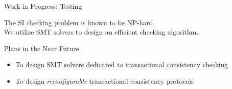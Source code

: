 
\begin{frame}{Work in Progress: Testing}
  \begin{center}

    \vspace{0.50cm}
    The SI checking problem is known to be \textsf{NP-hard}. \\[10pt]
    We utilize SMT solvers to design an efficient checking algorithm.
  \end{center}
\end{frame}

\begin{frame}{Plans in the Near Future}
  \begin{itemize}
    \setlength{\itemsep}{8pt}
    \item To design SMT solvers dedicated to transactional consistency checking
    \item To design \emph{reconfigurable} transactional consistency protocols
  \end{itemize}
\end{frame}
